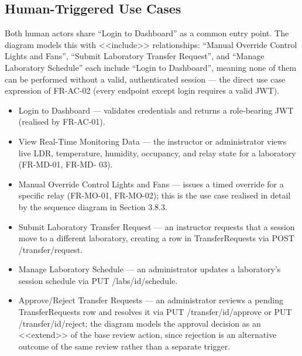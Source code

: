 \subsection{Human-Triggered Use Cases}

Both human actors share ``Login to Dashboard'' as a common entry point. The diagram models this
with <<include>> relationships: ``Manual Override Control Lights and Fans'', ``Submit Laboratory
Transfer Request'', and ``Manage Laboratory Schedule'' each include ``Login to Dashboard'',
meaning none of them can be performed without a valid, authenticated session --- the direct use
case expression of FR-AC-02 (every endpoint except login requires a valid JWT).

\begin{itemize}
  \item Login to Dashboard --- validates credentials and returns a role-bearing JWT (realised by
FR-AC-01).
\end{itemize}

\begin{itemize}
  \item View Real-Time Monitoring Data --- the instructor or administrator views live LDR,
temperature, humidity, occupancy, and relay state for a laboratory (FR-MD-01, FR-MD-
03).
\end{itemize}

\begin{itemize}
  \item Manual Override Control Lights and Fans --- issues a timed override for a specific relay
(FR-MO-01, FR-MO-02); this is the use case realised in detail by the sequence diagram in
Section 3.8.3.
\end{itemize}

\begin{itemize}
  \item Submit Laboratory Transfer Request --- an instructor requests that a session move to a
different laboratory, creating a row in TransferRequests via POST /transfer/request.
\end{itemize}

\begin{itemize}
  \item Manage Laboratory Schedule --- an administrator updates a laboratory's session schedule
via PUT /labs/{id}/schedule.
\end{itemize}

\begin{itemize}
  \item Approve/Reject      Transfer   Requests        ---   an   administrator    reviews     a    pending
TransferRequests row and resolves it via PUT /transfer/{id}/approve or PUT
/transfer/{id}/reject; the diagram models the approval decision as an <<extend>> of the base
review action, since rejection is an alternative outcome of the same review rather than a
separate trigger.
\end{itemize}

